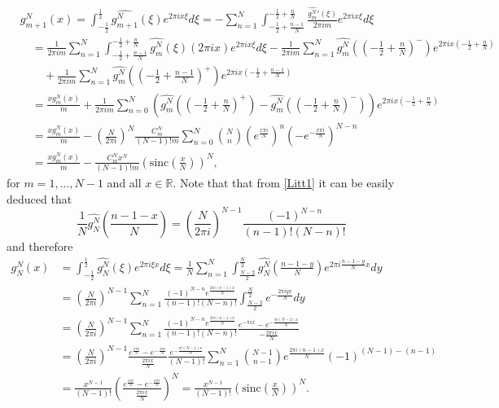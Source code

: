 \documentclass[reqno]{amsart}
\theoremstyle{plain}
\theoremstyle{definition}
\numberwithin{equation}{section}
\newcommand{\R}{{\mathbb R}}
\newcommand{\pa}[1]{\left(#1\right)}
\newcommand{\sinc}{\mathrm{sinc}}
\begin{document}
\begin{align}
	& g^N_{m+1}(x)
	= \int_{-\frac{1}{2}}^\frac{1}{2} \widehat{g^N_{m+1}}(\xi) e^{2\pi i x \xi} d\xi
	= -\sum_{n=1}^N \int_{-\frac{1}{2}+\frac{n-1}{N}}^{-\frac{1}{2}+\frac{n}{N}} 
	\frac{\widehat{g^N_m}'(\xi)}{2\pi i m} e^{2\pi i x \xi} d\xi \nonumber \\
	& \quad = \frac{1}{2\pi i m}\sum_{n=1}^N \int_{-\frac{1}{2}+\frac{n-1}{N}}^{-\frac{1}{2}+\frac{n}{N}} 
	\widehat{g^N_m}(\xi) (2\pi i x) e^{2\pi i x \xi} d\xi -\frac{1}{2\pi i m}\sum_{n=1}^N 
	\widehat{g^N_m}\pa{\pa{-\frac{1}{2}+\frac{n}{N}}^-}e^{2\pi i x \pa{-\frac{1}{2}+\frac{n}{N}}}
    \nonumber \\
    & \quad \quad + \frac{1}{2\pi i m}\sum_{n=1}^N 
	\widehat{g^N_m}\pa{\pa{-\frac{1}{2}+\frac{n-1}{N}}^+}e^{2\pi i x \pa{-\frac{1}{2}+\frac{n-1}{N}}} 
    \label{Litt4} \\
	& \quad = \frac{x g^N_m(x)}{m}  + \frac{1}{2\pi i m} \sum_{n=0}^N 
	\pa{\widehat{g^N_m}\pa{\pa{-\frac{1}{2}+\frac{n}{N}}^+}
    -\widehat{g^N_m}\pa{\pa{-\frac{1}{2}+\frac{n}{N}}^-}}
	e^{2\pi i x \pa{-\frac{1}{2}+\frac{n}{N}}} \nonumber \\
	& \quad = \frac{x g^N_m(x)}{m} - \pa{\frac{N}{2\pi i}}^N \frac{C^N_m}{(N-1)! m}
    \sum_{n=0}^N {N \choose n}
	\pa{e^\frac{x\pi i}{N}}^n \pa{-e^{-\frac{x\pi i}{N}}}^{N-n} \nonumber \\
	& \quad = \frac{x g^N_m(x)}{m} - \frac{C^N_m x^N}{(N-1)! m} \pa{\sinc\pa{\frac{x}{N}}}^N, \nonumber
\end{align}
for $m=1,...,N-1$ and all $x\in\R$. Note that that from \eqref{Litt1} it can be easily deduced that
$$\frac{1}{N}\widehat{g^N_N}\pa{\frac{n-1-x}{N}}= \pa{\frac{N}{2\pi i}}^{N-1}\frac{(-1)^{N-n}}{(n-1)!(N-n)!}$$
and therefore
\begin{align*}
    g^N_N (x) &= \int_{-\frac{1}{2}}^\frac{1}{2} \widehat{g^N_N}(\xi) e^{2\pi i \xi x} d\xi 
    = \frac{1}{N} \sum_{n=1}^N \int_\frac{N-2}{2}^\frac{N}{2} \widehat{g^N_N}\pa{\frac{n-1-y}{N}} e^{2\pi i \frac{n-1-y}{N} x} dy \\
    &= \pa{\frac{N}{2\pi i}}^{N-1} \sum_{n=1}^N \frac{(-1)^{N-n} e^\frac{2\pi i (n-1) x}{N}}{(n-1)!(N-n)!} \int_\frac{N-2}{2}^\frac{N}{2} e^{-\frac{2\pi i y x}{N} } dy \\
    &= \pa{\frac{N}{2\pi i}}^{N-1} \sum_{n=1}^N \frac{(-1)^{N-n} e^\frac{2\pi i (n-1) x}{N}}{(n-1)!(N-n)!} \frac{e^{-\pi i x}-e^{-\frac{\pi i (N-2) x}{N} }}{-\frac{2\pi i x}{N}} \\
    &= \pa{\frac{N}{2\pi i}}^{N-1} \frac{e^\frac{x\pi i}{N}-e^{-\frac{x\pi i}{N}}}{\frac{2\pi i x}{N}}
    \frac{e^{-\frac{\pi i (N-1) x}{N}}}{(N-1)!}\sum_{n=1}^N {{N-1}\choose {n-1}} e^\frac{2\pi i (n-1) x}{N} (-1)^{(N-1)-(n-1)} \\
    &= \frac{x^{N-1}}{(N-1)!} \pa{\frac{e^\frac{x\pi i}{N}-e^{-\frac{x\pi i}{N}}}{\frac{2\pi i x}{N}}}^N
    =\frac{x^{N-1}}{(N-1)!} \pa{\sinc\pa{\frac{x}{N}}}^N.
\end{align*}
\end{document}
